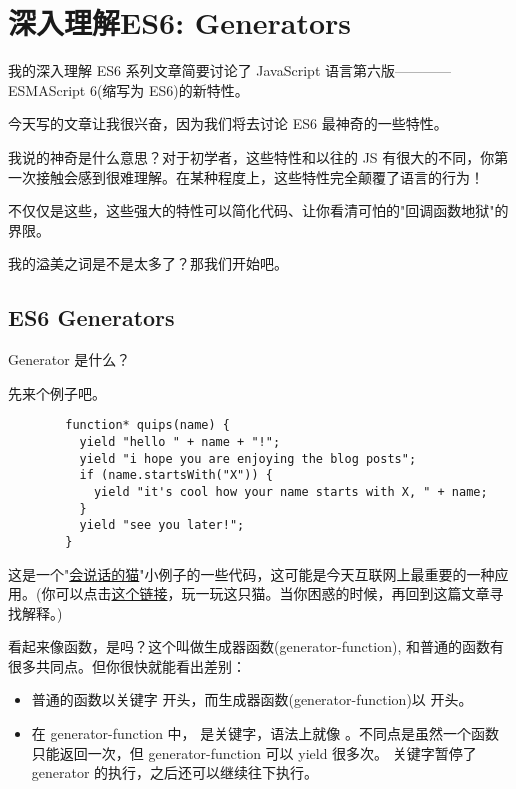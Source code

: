 
\thesistranslationchinese
\section{深入理解ES6: Generators}
  我的深入理解 ES6 系列文章简要讨论了 JavaScript 语言第六版————ESMAScript 6(缩写为 ES6)的新特性。

  今天写的文章让我很兴奋，因为我们将去讨论 ES6 最神奇的一些特性。

  我说的神奇是什么意思？对于初学者，这些特性和以往的 JS 有很大的不同，你第一次接触会感到很难理解。在某种程度上，这些特性完全颠覆了语言的行为！

  不仅仅是这些，这些强大的特性可以简化代码、让你看清可怕的"回调函数地狱"的界限。

  我的溢美之词是不是太多了？那我们开始吧。

  \subsection{ES6 Generators}
    \label{subsec:es6_generators}
      Generator 是什么？

      先来个例子吧。

      \begin{lstlisting}
        function* quips(name) {
          yield "hello " + name + "!";
          yield "i hope you are enjoying the blog posts";
          if (name.startsWith("X")) {
            yield "it's cool how your name starts with X, " + name;
          }
          yield "see you later!";
        }
      \end{lstlisting}

      这是一个"\href{http://people.mozilla.org/~jorendorff/demos/meow.html}{会说话的猫}"小例子的一些代码，这可能是今天互联网上最重要的一种应用。(你可以点击\href{http://people.mozilla.org/~jorendorff/demos/meow.html}{这个链接}，玩一玩这只猫。当你困惑的时候，再回到这篇文章寻找解释。)

      看起来像函数，是吗？这个叫做生成器函数(generator-function), 和普通的函数有很多共同点。但你很快就能看出差别：

      \begin{itemize}
        \item 普通的函数以关键字  开头，而生成器函数(generator-function)以  开头。
        \item 在 generator-function 中， 是关键字，语法上就像 。不同点是虽然一个函数只能返回一次，但 generator-function 可以 yield 很多次。 关键字暂停了 generator 的执行，之后还可以继续往下执行。
      \end{itemize}

